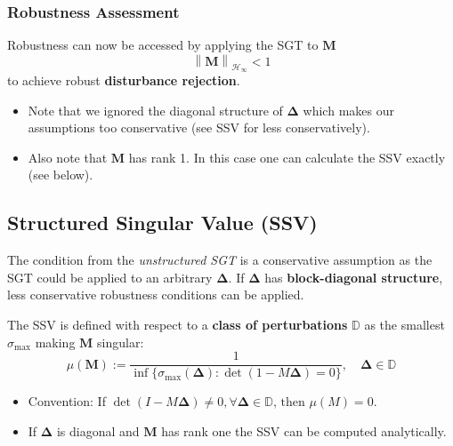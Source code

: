 \subsubsection{Robustness Assessment}
Robustness can now be accessed by applying the SGT to $\mathbf{M}$
\begin{equation*}
    \left\|\mathbf{M}\right\|_{\mathcal{H}_\infty}<1
\end{equation*}
to achieve robust \textbf{disturbance rejection}.

\newpar{}
\begin{itemize}
    \item Note that we ignored the diagonal structure of $\boldsymbol{\Delta}$ which makes our assumptions too conservative (see SSV for less conservatively).
    \item Also note that $\mathbf{M}$ has rank 1. In this case one can calculate the SSV exactly (see below).
\end{itemize}

\subsection{Structured Singular Value (SSV)}
The condition from the \textit{unstructured SGT} is a conservative assumption as the SGT could be applied to an arbitrary $\boldsymbol{\Delta}$.
If $\boldsymbol{\Delta}$ has \textbf{block-diagonal structure}, less conservative robustness conditions can be applied.

\newpar{}

The SSV is defined with respect to a \textbf{class of perturbations} $\mathbb{D}$ as the smallest $\sigma_{\max}$ making $\mathbf{M}$ singular:
\begin{equation*}
    \mu(\mathbf{M}):=\frac1{\inf\{\sigma_{\max}(\boldsymbol{\Delta}):\det(1-M\boldsymbol{\Delta})=0\}},\quad\boldsymbol{\Delta}\in\mathbb{D}
\end{equation*}
\begin{itemize}
    \item Convention: If $\det(I-M\boldsymbol{\Delta})\neq0,\forall\boldsymbol{\Delta}\in\mathbb{D}\text{, then }\mu(M)=0$.
    \item If $\boldsymbol{\Delta}$ is diagonal and $\mathbf{M}$ has rank one the SSV can be computed analytically.
\end{itemize}

